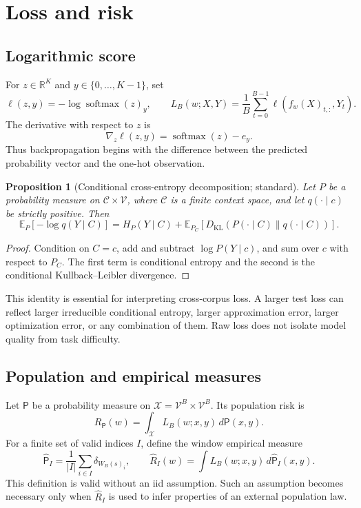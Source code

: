 \documentclass[11pt]{article}
\newtheorem{proposition}[definition]{Proposition}
\newcommand{\V}{\mathcal V}
\newcommand{\X}{\mathcal X}
\newcommand{\E}{\mathbb E}
\newcommand{\R}{\mathbb R}
\newcommand{\1}{\mathbf 1}
\newcommand{\KL}{D_{\mathrm{KL}}}
\newcommand{\softmax}{\operatorname{softmax}}
\begin{document}
\section{Loss and risk}

\subsection{Logarithmic score}

For $z\in\R^K$ and $y\in\{0,\ldots,K-1\}$, set
\[
 \ell(z,y)=-\log\softmax(z)_y,
 \qquad
 L_B(w;X,Y)=\frac1B\sum_{t=0}^{B-1}\ell(f_w(X)_{t,:},Y_t).
\]
The derivative with respect to $z$ is
\[
 \nabla_z\ell(z,y)=\softmax(z)-e_y.
\]
Thus backpropagation begins with the difference between the predicted
probability vector and the one-hot observation.

\begin{proposition}[Conditional cross-entropy decomposition; standard]
Let $P$ be a probability measure on $\mathcal C\times\V$, where $\mathcal C$
is a finite context space, and let $q(\cdot\mid c)$ be strictly positive.
Then
\[
 \E_P[-\log q(Y\mid C)]
 =H_P(Y\mid C)+
 \E_{P_C}\!\left[\KL(P(\cdot\mid C)\|q(\cdot\mid C))\right].
\]
\end{proposition}

\begin{proof}
Condition on $C=c$, add and subtract $\log P(Y\mid c)$, and sum over
$c$ with respect to $P_C$. The first term is conditional entropy and the
second is the conditional Kullback--Leibler divergence.
\end{proof}

This identity is essential for interpreting cross-corpus loss. A larger test
loss can reflect larger irreducible conditional entropy, larger approximation
error, larger optimization error, or any combination of them. Raw loss does
not isolate model quality from task difficulty.

\subsection{Population and empirical measures}

Let $\mathsf P$ be a probability measure on
$\X=\V^B\times\V^B$. Its population risk is
\[
 R_{\mathsf P}(w)=\int_{\X}L_B(w;x,y)\,d\mathsf P(x,y).
\]
For a finite set of valid indices $I$, define the window empirical measure
\[
 \widehat{\mathsf P}_I=\frac1{|I|}\sum_{i\in I}\delta_{W_B(s)_i},
 \qquad
 \widehat R_I(w)=\int L_B(w;x,y)\,d\widehat{\mathsf P}_I(x,y).
\]
This definition is valid without an iid assumption. Such an assumption becomes
necessary only when $\widehat R_I$ is used to infer properties of an external
population law.
\end{document}
